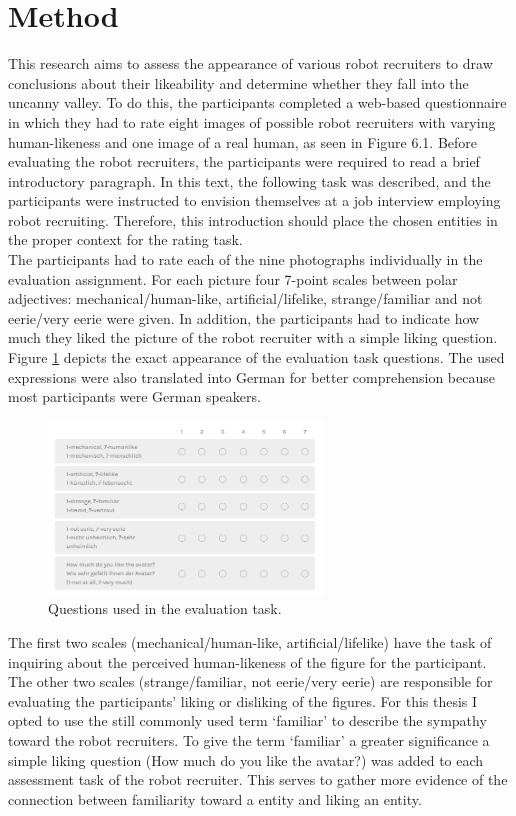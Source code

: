\section{Method}
This research aims to assess the appearance of various robot recruiters to draw conclusions about their likeability and determine whether they fall into the uncanny valley. To do this, the participants completed a web-based questionnaire in which they had to rate eight images of possible robot recruiters with varying human-likeness and one image of a real human, as seen in Figure 6.1. Before evaluating the robot recruiters, the participants were required to read a brief introductory paragraph. In this text, the following task was described, and the participants were instructed to envision themselves at a job interview employing robot recruiting. Therefore, this introduction should place the chosen entities in the proper context for the rating task. \\
The participants had to rate each of the nine photographs individually in the evaluation assignment. For each picture four 7-point scales between polar adjectives: mechanical/human-like, artificial/lifelike, strange/familiar and not eerie/very eerie were given. In addition, the participants had to indicate how much they liked the picture of the robot recruiter with a simple liking question. Figure \ref{fig:evaluation_task} depicts the exact appearance of the evaluation task questions. The used expressions were also translated into German for better comprehension because most participants were German speakers.
\begin{figure} %
    \centering
    \includegraphics[width=0.65\textwidth]{graphics/evaluation_task.png}
    \caption{Questions used in the evaluation task.}
    \label{fig:evaluation_task}
\end{figure}
The first two scales (mechanical/human-like, artificial/lifelike)  have the task of inquiring about the perceived human-likeness of the figure for the participant. The other two scales (strange/familiar, not eerie/very eerie) are responsible for evaluating the participants' liking or disliking of the figures. For this thesis I opted to use the still commonly used term `familiar' to describe the sympathy toward the robot recruiters. To give the term `familiar' a greater significance a simple liking question (How much do you like the avatar?) was added to each assessment task of the robot recruiter. This serves to gather more evidence of the connection between familiarity toward a entity and liking an entity.\\
